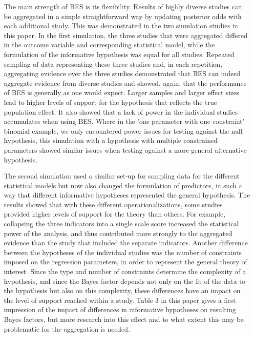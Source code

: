 \documentclass[11pt,reqno]{article}
\begin{document}
The main strength of BES is its flexibility. Results of highly diverse studies can be aggregated in a simple straightforward way by updating posterior odds with each additional study. This was demonstrated in the two simulation studies in this paper. In the first simulation, the three studies that were aggregated differed in the outcome variable and corresponding statistical model, while the formulation of the informative hypothesis was equal for all studies. Repeated sampling of data representing these three studies and, in each repetition, aggregating evidence over the three studies demonstrated that BES can indeed aggregate evidence from diverse studies and showed, again, that the performance of BES is generally as one would expect. Larger samples and larger effect sizes lead to higher levels of support for the hypothesis that reflects the true population effect. It also showed that a lack of power in the individual studies accumulates when using BES. Where in the 'one parameter with one constraint' binomial example, we only encountered power issues for testing against the null hypothesis, this simulation with a hypothesis with multiple constrained parameters showed similar issues when testing against a more general alternative hypothesis. 

The second simulation used a similar set-up for sampling data for the different statistical models but now also changed the formulation of predictors, in such a way that different informative hypotheses represented the general hypothesis. The results showed that with these different operationalizations, some studies provided higher levels of support for the theory than others. For example, collapsing the three indicators into a single scale score increased the statistical power of the analysis, and thus contributed more strongly to the aggregated evidence than the study that included the separate indicators. Another difference between the hypotheses of the individual studies was the number of constraints imposed on the regression parameters, in order to represent the general theory of interest. Since the type and number of constraints determine the complexity of a hypothesis, and since the Bayes factor depends not only on the fit of the data to the hypothesis but also on this complexity, these differences have an impact on the level of support reached within a study. Table 3 in this paper gives a first impression of the impact of differences in informative hypotheses on resulting Bayes factors, but more research into this effect and to what extent this may be problematic for the aggregation is needed. 
\end{document}
